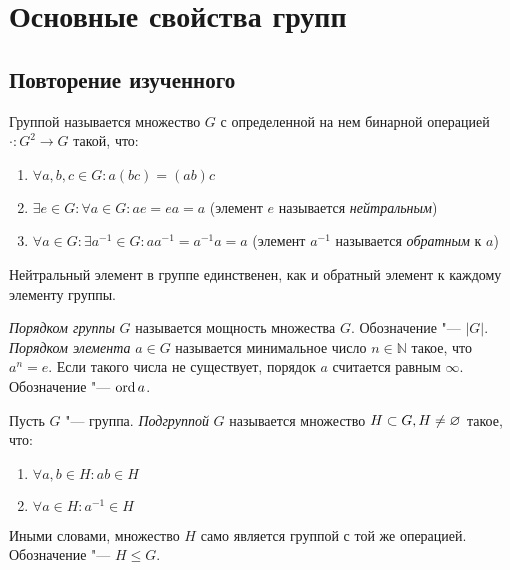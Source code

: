 \section{Основные свойства групп}

\subsection{Повторение изученного}

\begin{definition}
	Группой называется множество $G$ с определенной на нем бинарной операцией $\cdot: G^2 \to G$ такой, что:
	\begin{enumerate}
		\item $\forall a, b, c \in G: a(bc) = (ab)c$
		
		\item $\exists e \in G: \forall a \in G: ae = ea = a$ (элемент $e$ называется \textit{нейтральным})
		
		\item $\forall a \in G: \exists a^{-1} \in G: aa^{-1} = a^{-1}a = a$ (элемент $a^{-1}$ называется \textit{обратным} к $a$)
	\end{enumerate}
\end{definition}

\begin{reminder}
	Нейтральный элемент в группе единственен, как и обратный элемент к каждому элементу группы.
\end{reminder}

\begin{definition}
	\textit{Порядком группы} $G$ называется мощность множества $G$. Обозначение "--- $|G|$. \textit{Порядком элемента} $a \in G$ называется минимальное число $n \in \mathbb{N}$ такое, что $a^n = e$. Если такого числа не существует, порядок $a$ считается равным $\infty$. Обозначение "--- $\operatorname{ord}{a}$.
\end{definition}

\begin{definition}
	Пусть $G$ "--- группа. \textit{Подгруппой} $G$ называется множество $H \subset G, H \hm\ne \emptyset$ такое, что:
	\begin{enumerate}
		\item $\forall a, b \in H: ab \in H$
		
		\item $\forall a \in H: a^{-1} \in H$
	\end{enumerate}
	
	Иными словами, множество $H$ само является группой с той же операцией. Обозначение "--- $H \le G$.
\end{definition}


